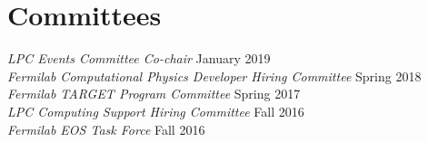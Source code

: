 \section{Committees}
{\sl LPC Events Committee Co-chair} \hfill January 2019\\
{\sl Fermilab Computational Physics Developer Hiring Committee} \hfill Spring 2018\\
{\sl Fermilab TARGET Program Committee} \hfill Spring 2017\\
{\sl LPC Computing Support Hiring Committee} \hfill Fall 2016\\
{\sl Fermilab EOS Task Force} \hfill Fall 2016%
